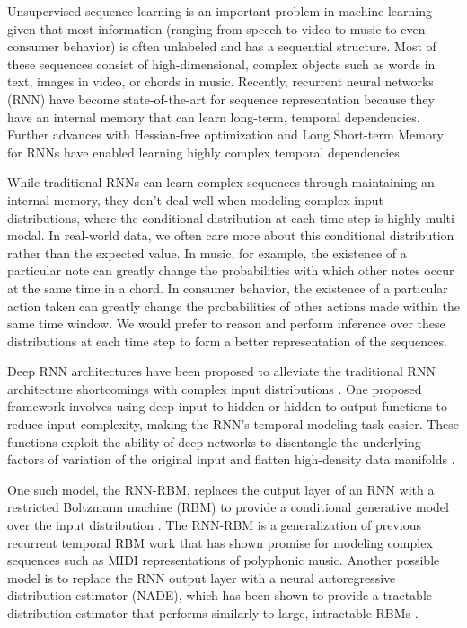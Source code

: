 Unsupervised sequence learning is an important problem in machine learning given that most information (ranging from speech to video to music to even consumer behavior) is often unlabeled and has a sequential structure. Most of these sequences consist of high-dimensional, complex objects such as words in text, images in video, or chords in music. Recently, recurrent neural networks (RNN) \cite{rnn} have become state-of-the-art for sequence representation because they have an internal memory that can learn long-term, temporal dependencies. Further advances with Hessian-free optimization and Long Short-term Memory for RNNs \cite{hessian_free, lstm} have enabled learning highly complex temporal dependencies.

While traditional RNNs can learn complex sequences through maintaining an internal memory, they don't deal well when modeling complex input distributions, where the conditional distribution at each time step is highly multi-modal. In real-world data, we often care more about this conditional distribution rather than the expected value. In music, for example, the existence of a particular note can greatly change the probabilities with which other notes occur at the same time in a chord. In consumer behavior, the existence of a particular action taken can greatly change the probabilities of other actions made within the same time window. We would prefer to reason and perform inference over these distributions at each time step to form a better representation of the sequences.

Deep RNN architectures have been proposed to alleviate the traditional RNN architecture shortcomings with complex input distributions \cite{deep_rnn}. One proposed framework involves using deep input-to-hidden or hidden-to-output functions to reduce input complexity, making the RNN's temporal modeling task easier. These functions exploit the ability of deep networks to disentangle the underlying factors of variation of the original input and flatten high-density data manifolds \cite{goodfellow09, glorot11, bengio13}.

One such model, the RNN-RBM, replaces the output layer of an RNN with a restricted Boltzmann machine (RBM) to provide a conditional generative model over the input distribution \cite{rnnrbm,boulanger14}. The RNN-RBM is a generalization of previous recurrent temporal RBM work \cite{rtrbm} that has shown promise for modeling complex sequences such as MIDI representations of polyphonic music. Another possible model is to replace the RNN output layer with a neural autoregressive distribution estimator (NADE), which has been shown to provide a tractable distribution estimator that performs similarly to large, intractable RBMs \cite{nade}.

